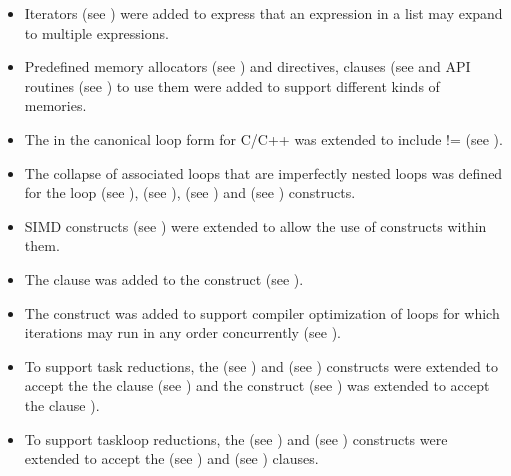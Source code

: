 \begin{itemize}
\item Iterators (see ) were added to express that an
      expression in a list may expand to multiple expressions.

\item Predefined memory allocators (see ) and
      directives, clauses (see  and
      API routines (see ) to use them
      were added to support different kinds of memories.

\item The  in the canonical loop form for C/C++ was
      extended to include != (see ).

\item The collapse of associated loops that are imperfectly nested loops
      was defined for the loop (see ),
       (see ), 
      (see ) and  (see
      ) constructs.

\item SIMD constructs (see ) were extended
      to allow the use of  constructs within them.

\item The  clause was added to the 
      construct (see ).

\item The  construct was added to support compiler
      optimization of loops for which iterations may run in any order
      concurrently (see ).

\item To support task reductions, the  (see
      ) and  (see
      ) constructs were extended to
      accept the the  clause (see
      ) and the 
      construct (see ) was extended
      to accept the  clause
      ).

\item To support taskloop reductions, the  (see
      ) and  (see
      ) constructs were extended
      to accept the  (see )
      and  (see )
      clauses.


\end{itemize}

